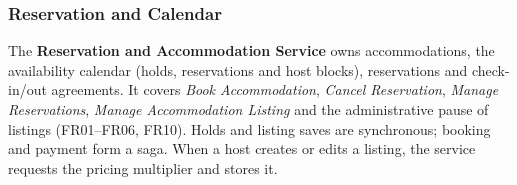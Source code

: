 \subsubsection{Reservation and Calendar}
\label{sec:res-style}

The \textbf{Reservation and Accommodation Service} owns accommodations, the
availability calendar (holds, reservations and host blocks), reservations and
check-in/out agreements. It covers \emph{Book Accommodation}, \emph{Cancel
Reservation}, \emph{Manage Reservations}, \emph{Manage Accommodation Listing}
and the administrative pause of listings (FR01--FR06, FR10). Holds and listing
saves are synchronous; booking and payment form a saga. When a host creates or
edits a listing, the service requests the pricing multiplier and stores it.

